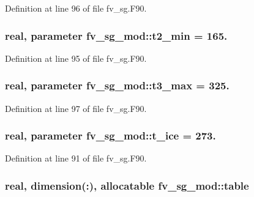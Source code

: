 Definition at line 96 of file fv\-\_\-sg.\-F90.

\subsubsection[{t2\-\_\-min}]{\setlength{\rightskip}{0pt plus 5cm}real, parameter fv\-\_\-sg\-\_\-mod\-::t2\-\_\-min = 165.\hspace{0.3cm}{\ttfamily [private]}}\label{classfv__sg__mod_ad9aa2baea22c517457629ab6821992fa}


Definition at line 95 of file fv\-\_\-sg.\-F90.

\subsubsection[{t3\-\_\-max}]{\setlength{\rightskip}{0pt plus 5cm}real, parameter fv\-\_\-sg\-\_\-mod\-::t3\-\_\-max = 325.\hspace{0.3cm}{\ttfamily [private]}}\label{classfv__sg__mod_a3d2e9d81e47d9e0be757a3b2978f00f3}


Definition at line 97 of file fv\-\_\-sg.\-F90.

\subsubsection[{t\-\_\-ice}]{\setlength{\rightskip}{0pt plus 5cm}real, parameter fv\-\_\-sg\-\_\-mod\-::t\-\_\-ice = 273.\hspace{0.3cm}{\ttfamily [private]}}\label{classfv__sg__mod_a46dc612b8ea952b410d9388e7734b1dc}


Definition at line 91 of file fv\-\_\-sg.\-F90.

\subsubsection[{table}]{\setlength{\rightskip}{0pt plus 5cm}real, dimension(\-:), allocatable fv\-\_\-sg\-\_\-mod\-::table\hspace{0.3cm}{\ttfamily [private]}}\label{classfv__sg__mod_a209ce37aa7b7e0fd8d042d2cd4cdacca}


